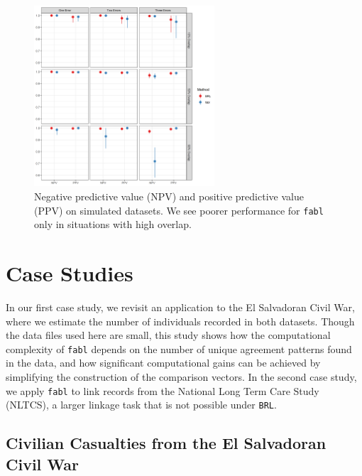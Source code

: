 \documentclass[ba]{imsart}
\begin{document}
\begin{figure}[t]
\begin{center}
	\includegraphics[width=0.6\textwidth]{../notes/figures/sadinle_sim_plot_partial} 
	\caption{Negative predictive value (NPV) and positive predictive value (PPV) on simulated datasets. We see poorer performance for \texttt{fabl} only in situations with high overlap.}
	\label{fig:sadinle_simulation_partial}
\end{center}
\end{figure}

\section{Case Studies}
\label{sec:case-studies}

In our first case study, we revisit an application to the El Salvadoran Civil War, where we estimate the number of individuals recorded in both datasets. Though the data files used here are small, this study shows how the computational complexity of \texttt{fabl} depends on the number of unique agreement patterns found in the data, and how significant computational gains can be achieved by simplifying the construction of the comparison vectors. In the second case study, we apply \texttt{fabl} to link records from the National Long Term Care Study (NLTCS), a larger linkage task that is not possible under \texttt{BRL}.

\subsection{Civilian Casualties from the El Salvadoran Civil War}
\label{el_salvador}
\end{document}
